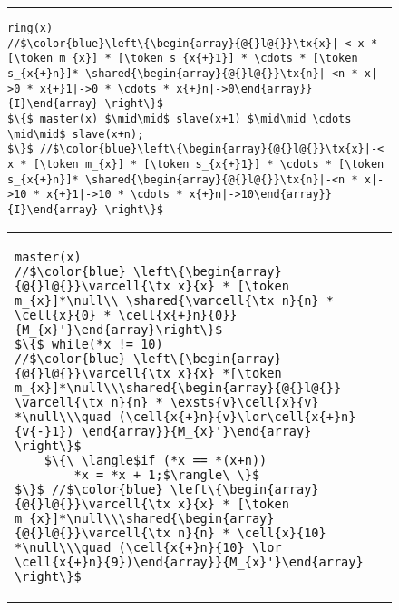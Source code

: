 \begin{figure}
\centering
\noindent\hrule\vspace{10pt}
\vspace{-3ex}
{\begin{lstlisting}[numbers=none,numbersep=5pt]
ring(x)
//$\color{blue}\left\{\begin{array}{@{}l@{}}\tx{x}|-< x * [\token m_{x}] * [\token s_{x{+}1}] * \cdots * [\token s_{x{+}n}]* \shared{\begin{array}{@{}l@{}}\tx{n}|-<n * x|->0 * x{+}1|->0 * \cdots * x{+}n|->0\end{array}}{I}\end{array} \right\}$
$\{$ master(x) $\mid\mid$ slave(x+1) $\mid\mid \cdots \mid\mid$ slave(x+n);
$\}$ //$\color{blue}\left\{\begin{array}{@{}l@{}}\tx{x}|-< x * [\token m_{x}] * [\token s_{x{+}1}] * \cdots * [\token s_{x{+}n}]* \shared{\begin{array}{@{}l@{}}\tx{n}|-<n * x|->10 * x{+}1|->10 * \cdots * x{+}n|->10\end{array}}{I}\end{array} \right\}$
\end{lstlisting}}
\vspace{-2ex}
\begin{tabular}{@{} l @{\hspace{8ex}} l@{}}
{\begin{lstlisting}
master(x)
//$\color{blue} \left\{\begin{array}{@{}l@{}}\varcell{\tx x}{x} * [\token m_{x}]*\null\\ \shared{\varcell{\tx n}{n} * \cell{x}{0} * \cell{x{+}n}{0}}{M_{x}'}\end{array}\right\}$
$\{$ while(*x != 10)
//$\color{blue} \left\{\begin{array}{@{}l@{}}\varcell{\tx x}{x} *[\token m_{x}]*\null\\\shared{\begin{array}{@{}l@{}} \varcell{\tx n}{n} * \exsts{v}\cell{x}{v} *\null\\\quad (\cell{x{+}n}{v}\lor\cell{x{+}n}{v{-}1}) \end{array}}{M_{x}'}\end{array} \right\}$
    $\{\ \langle$if (*x == *(x+n))
        *x = *x + 1;$\rangle\ \}$
$\}$ //$\color{blue} \left\{\begin{array}{@{}l@{}}\varcell{\tx x}{x} * [\token m_{x}]*\null\\\shared{\begin{array}{@{}l@{}}\varcell{\tx n}{n} * \cell{x}{10} *\null\\\quad (\cell{x{+}n}{10} \lor \cell{x{+}n}{9})\end{array}}{M_{x}'}\end{array} \right\}$

\end{lstlisting}}
\end{tabular}
\end{figure}
